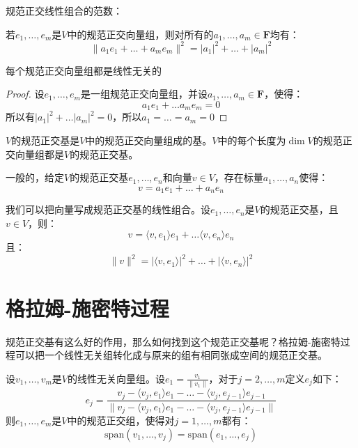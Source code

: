 \documentclass[10pt,a4paper,UTF8]{article}
\begin{document}
规范正交线性组合的范数：

若\(e_{1},\ldots ,e_{m}\)是\(V\)中的规范正交向量组，则对所有的\(a_{1},\ldots ,a_{m}\in \mathbf{F}\)均有：
\begin{equation}
\label{eq:2}
\| a_{1}e_{1} + \ldots + a_{m}e_{m} \|^{2} = |a_{1}|^{2} + \ldots + |a_{m}|^{2}
\end{equation}

\begin{theorem}
每个规范正交向量组都是线性无关的
\end{theorem}
\begin{proof}
设\(e_{1},\ldots ,e_{m}\)是一组规范正交向量组，并设\(a_{1},\ldots ,a_{m}\in \mathbf{F}\)，使得：
\begin{equation}
\label{eq:3}
a_{1}e_{1} + \ldots a_{m}e_{m} = 0
\end{equation}
所以有\(|a_{1}|^{2} + \ldots |a_{m}|^{2} = 0\)，所以\(a_{1} = \ldots = a_{m} = 0\)
\end{proof}

\begin{definition}
\(V\)的规范正交基是\(V\)中的规范正交向量组成的基。\(V\)中的每个长度为\(\dim V\)的规范正交向量组都是\(V\)的规范正交基。
\end{definition}
一般的，给定\(V\)的规范正交基\(e_{1},\ldots ,e_{n}\)和向量\(v\in V\)，存在标量\(a_{1},\ldots ,a_{n}\)使得：
\[v= a_{1}e_{1} + \ldots + a_{n}e_{n}\]

我们可以把向量写成规范正交基的线性组合。设\(e_{1},\ldots ,e_{n}\)是\(V\)的规范正交基，且\(v\in V\)，则：
\begin{equation}
\label{eq:4}
v= \langle v,e_{1} \rangle e_{1} + \ldots \langle v,e_{n} \rangle e_{n}
\end{equation}
且：
\begin{equation}
\label{eq:5}
\| v \|^{2} = | \langle v,e_{1} \rangle  |^{2} + \ldots + | \langle v,e_{n} \rangle  |^{2}
\end{equation}

\section{格拉姆-施密特过程}
\label{sec:org45c8eb9}


规范正交基有这么好的作用，那么如何找到这个规范正交基呢？格拉姆-施密特过程可以把一个线性无关组转化成与原来的组有相同张成空间的规范正交基。

\begin{theorem}
设\(v_{1},\ldots ,v_{m}\)是\(V\)的线性无关向量组。设\(e_{1} = \frac{v_{1}}{\| v_{1} \| }\)，对于\(j = 2,\ldots ,m\)定义\(e_{j}\)如下：
\begin{equation}
\label{eq:6}
e_{j} = \frac{v_{j} - \langle v_{j},e_{1} \rangle e_{1} - \ldots - \langle v_{j},e_{j-1} \rangle e_{j-1}   }{ \| v_{j} - \langle v_{j},e_{1} \rangle e_{1} - \ldots - \langle v_{j},e_{j-1} \rangle e_{j-1}  \| }
\end{equation}
则\(e_{1},\ldots ,e_{m}\)是\(V\)中的规范正交组，使得对\(j=1,\ldots ,m\)都有：
\begin{equation}
\label{eq:7}
\mathrm{span}(v_{1},\ldots ,v_{j}) = \mathrm{span}(e_{1},\ldots ,e_{j})
\end{equation}
\end{theorem}
\end{document}
